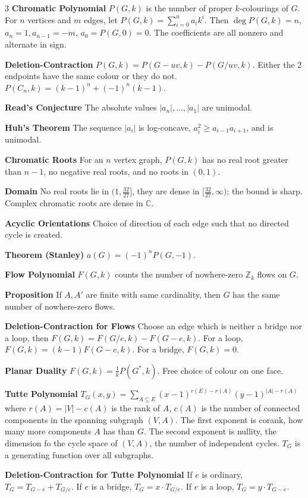\documentclass[10pt, landscape]{article}
\begin{document}
\begin{multicols*}{3}
\textbf{Chromatic Polynomial} $P(G,k)$ is the number of proper $k$-colourings of $G$. For $n$ vertices and $m$ edges, let $P(G,k)=\sum_{i=0}^n a_i k^i$. Then $\deg P(G,k)=n$, $a_n=1, a_{n-1}=-m$, $a_0=P(G,0)=0$. The coefficients are all nonzero and alternate in sign.

\textbf{Deletion-Contraction} $P(G,k)=P(G-uv,k)-P(G/uv, k)$. Either the 2 endpoints have the same colour or they do not. $P(C_n, k)=(k-1)^n+(-1)^n(k-1)$.

\textbf{Read's Conjecture} The absolute values $|a_n|,...,|a_1|$ are unimodal.

\textbf{Huh's Theorem} The sequence $|a_i|$ is log-concave, $a_i^2 \geq a_{i-1}a_{i+1}$, and is unimodal.

\textbf{Chromatic Roots} For an $n$ vertex graph, $P(G,k)$ has no real root greater than $n-1$, no negative real roots, and no roots in $(0,1)$.

\textbf{Domain} No real roots lie in $(1, \frac{32}{27}]$, they are dense in $[\frac{32}{27}, \infty)$; the bound is sharp. Complex chromatic roots are dense in $\mathbb{C}$.

\textbf{Acyclic Orientations} Choice of direction of each edge such that no directed cycle is created.

\textbf{Theorem (Stanley)} $a(G)=(-1)^nP(G, -1)$.

\textbf{Flow Polynomial} $F(G,k)$ counts the number of nowhere-zero $\mathbb{Z}_k$ flows on $G$.

\textbf{Proposition} If $A, A'$ are finite with same cardinality, then $G$ has the same number of nowhere-zero flows.

\textbf{Deletion-Contraction for Flows} Choose an edge which is neither a bridge nor a loop, then $F(G,k)=F(G/e, k)-F(G-e,k)$. For a loop, $F(G,k)=(k-1)F(G-e,k)$. For a bridge, $F(G,k)=0$.

\textbf{Planar Duality} $F(G,k)=\frac{1}{k}P(G^*, k)$. Free choice of colour on one face.

\textbf{Tutte Polynomial} $T_G(x, y)=\sum_{A \subseteq E} (x-1)^{r(E)-r(A)}(y-1)^{|A|-r(A)}$ where $r(A)=|V|-c(A)$ is the rank of $A$, $c(A)$ is the number of connected components in the spanning subgraph $(V,A)$. The first exponent is corank, how many more components $A$ has than $G$. The second exponent is nullity, the dimension fo the cycle space of $(V,A)$, the number of independent cycles. $T_G$ is a generating function over all subgraphs.

\textbf{Deletion-Contraction for Tutte Polynomial} If $e$ is ordinary, $T_G=T_{G-e}+T_{G/e}$. If $e$ is a bridge, $T_G=x \cdot T_{G/e}$. If $e$ is a loop, $T_G=y \cdot T_{G-e}$.


\end{multicols*}
\end{document}

